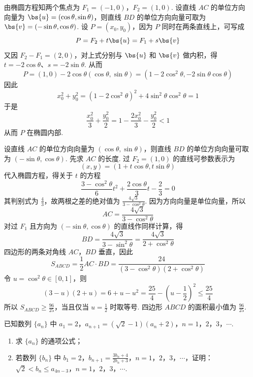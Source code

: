\begin{solution}
由椭圆方程知两个焦点为 \(F_1=(-1,0)\)，\(F_2=(1,0)\). 设直线 \(AC\) 的单位方向向量为 \(\bs{u}=(\cos\theta,\sin\theta)\)，则直线 \(BD\) 的单位方向向量可取为 \(\bs{v}=(-\sin\theta,\cos\theta)\). 设 \(P=(x_0,y_0)\)，因为 \(P\) 同时在两条直线上，可写成
\[
P=F_2+t\bs{u}=F_1+s\bs{v}
\]
又因 \(F_2-F_1=(2,0)\)，对上式分别与 \(\bs{u}\) 和 \(\bs{v}\) 做内积，得 \(t=-2\cos\theta\)、\(s=-2\sin\theta\). 从而
\[
P=(1,0)-2\cos\theta(\cos\theta,\sin\theta)
  =(1-2\cos^2\theta,-2\sin\theta\cos\theta)
\]
因此
\[
x_0^2+y_0^2=(1-2\cos^2\theta)^2+4\sin^2\theta\cos^2\theta=1
\]
于是
\[
\frac{x_0^2}{3}+\frac{y_0^2}{2}=1-\frac{2x_0^2}{3}-\frac{y_0^2}{2}<1
\]
从而 \(P\) 在椭圆内部.

设直线 \(AC\) 的单位方向向量为 \((\cos\theta,\sin\theta)\)，则直线 \(BD\) 的单位方向向量可取为 \((-\sin\theta,\cos\theta)\). 先求 \(AC\) 的长度. 过 \(F_2=(1,0)\) 的直线可参数表示为
\[
(x,y)=(1+t\cos\theta,t\sin\theta)
\]
代入椭圆方程，得关于 \(t\) 的方程
\[
\frac{3-\cos^2\theta}{6}t^2+\frac{2\cos\theta}{3}t-\frac23=0
\]
其判别式为 \(\frac43\)，故两根之差的绝对值为 \(\frac{4\sqrt3}{3-\cos^2\theta}\). 因为方向向量是单位向量，所以
\[
AC=\frac{4\sqrt3}{3-\cos^2\theta}
\]
对过 \(F_1\) 且方向为 \((-\sin\theta,\cos\theta)\) 的直线作同样计算，得
\[
BD=\frac{4\sqrt3}{3-\sin^2\theta}=\frac{4\sqrt3}{2+\cos^2\theta}
\]
四边形的两条对角线 \(AC\)，\(BD\) 垂直，因此
\[
S_{ABCD}=\frac12AC\cdot BD=\frac{24}{(3-\cos^2\theta)(2+\cos^2\theta)}
\]
令 \(u=\cos^2\theta\in[0,1]\)，则
\[
(3-u)(2+u)=6+u-u^2=\frac{25}{4}-\left(u-\frac12\right)^2\leqslant\frac{25}{4}
\]
所以 \(S_{ABCD}\geqslant\frac{96}{25}\)，当且仅当 \(u=\frac12\) 时取等号. 四边形 \(ABCD\) 的面积最小值为 \(\frac{96}{25}\).
\end{solution}

\begin{problem}
已知数列 \(\{a_{n}\}\) 中 \(a_{1} = 2\)，\(a_{n+1} = (\sqrt{2} - 1)(a_{n} + 2)\)，\(n = 1\)，\(2\)，\(3\)，\(\cdots\).

\begin{enumerate}
\item 求 \(\{a_{n}\}\) 的通项公式；
\item 若数列 \(\{b_n\}\) 中 \(b_1 = 2\)，\(b_{n+1} = \frac{3b_n + 4}{2b_n + 3}\)，\(n = 1\)，\(2\)，\(3\)，\(\cdots\)，证明：\(\sqrt{2} < b_n \leqslant a_{4n-3}\)，\(n = 1\)，\(2\)，\(3\)，\(\cdots\).
\end{enumerate}
\end{problem}

